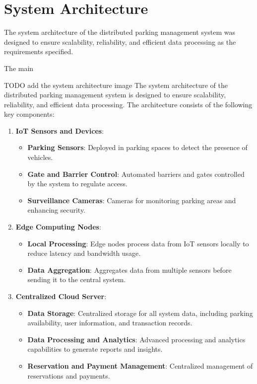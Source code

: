 \documentclass[oneside, 12pt, a4paper, draft]{book}
\begin{document}
\section{System Architecture}
\label{sec:org97f05bf}
The system architecture of the distributed parking management system was designed to ensure scalability, reliability, and efficient data processing as the requirements specified.


The main

TODO add the system architecture image
The system architecture of the distributed parking management system is designed to ensure scalability, reliability, and efficient data processing. The architecture consists of the following key components:

\begin{enumerate}
\item \textbf{\textbf{IoT Sensors and Devices}}:
\begin{itemize}
\item \textbf{\textbf{Parking Sensors}}: Deployed in parking spaces to detect the presence of vehicles.
\item \textbf{\textbf{Gate and Barrier Control}}: Automated barriers and gates controlled by the system to regulate access.
\item \textbf{\textbf{Surveillance Cameras}}: Cameras for monitoring parking areas and enhancing security.
\end{itemize}

\item \textbf{\textbf{Edge Computing Nodes}}:
\begin{itemize}
\item \textbf{\textbf{Local Processing}}: Edge nodes process data from IoT sensors locally to reduce latency and bandwidth usage.
\item \textbf{\textbf{Data Aggregation}}: Aggregates data from multiple sensors before sending it to the central system.
\end{itemize}

\item \textbf{\textbf{Centralized Cloud Server}}:
\begin{itemize}
\item \textbf{\textbf{Data Storage}}: Centralized storage for all system data, including parking availability, user information, and transaction records.
\item \textbf{\textbf{Data Processing and Analytics}}: Advanced processing and analytics capabilities to generate reports and insights.
\item \textbf{\textbf{Reservation and Payment Management}}: Centralized management of reservations and payments.
\end{itemize}


\end{enumerate}
\end{document}
